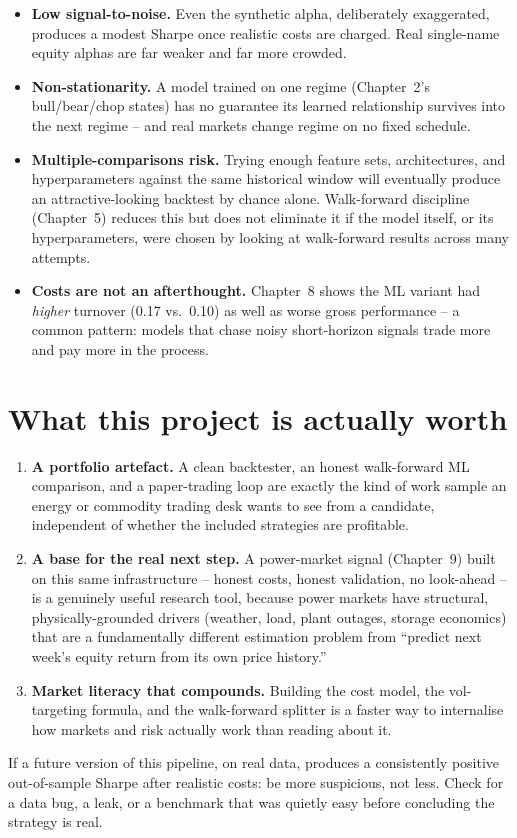 \begin{itemize}
  \item \textbf{Low signal-to-noise.} Even the synthetic alpha, deliberately
  exaggerated, produces a modest Sharpe once realistic costs are charged. Real
  single-name equity alphas are far weaker and far more crowded.
  \item \textbf{Non-stationarity.} A model trained on one regime (Chapter~2's
  bull/bear/chop states) has no guarantee its learned relationship survives
  into the next regime -- and real markets change regime on no fixed schedule.
  \item \textbf{Multiple-comparisons risk.} Trying enough feature sets,
  architectures, and hyperparameters against the same historical window will
  eventually produce an attractive-looking backtest by chance alone. Walk-forward
  discipline (Chapter~5) reduces this but does not eliminate it if the model
  itself, or its hyperparameters, were chosen by looking at walk-forward
  results across many attempts.
  \item \textbf{Costs are not an afterthought.} Chapter~8 shows the ML variant
  had \emph{higher} turnover (0.17 vs.\ 0.10) as well as worse gross performance
  -- a common pattern: models that chase noisy short-horizon signals trade more
  and pay more in the process.
\end{itemize}

\section{What this project is actually worth}

\begin{enumerate}
  \item \textbf{A portfolio artefact.} A clean backtester, an honest walk-forward
  ML comparison, and a paper-trading loop are exactly the kind of work sample an
  energy or commodity trading desk wants to see from a candidate, independent of
  whether the included strategies are profitable.
  \item \textbf{A base for the real next step.} A power-market signal (Chapter~9)
  built on this same infrastructure -- honest costs, honest validation, no
  look-ahead -- is a genuinely useful research tool, because power markets have
  structural, physically-grounded drivers (weather, load, plant outages, storage
  economics) that are a fundamentally different estimation problem from ``predict
  next week's equity return from its own price history.''
  \item \textbf{Market literacy that compounds.} Building the cost model, the
  vol-targeting formula, and the walk-forward splitter is a faster way to
  internalise how markets and risk actually work than reading about it.
\end{enumerate}

\begin{caveat}
If a future version of this pipeline, on real data, produces a consistently
positive out-of-sample Sharpe after realistic costs: be more suspicious, not
less. Check for a data bug, a leak, or a benchmark that was quietly easy before
concluding the strategy is real.
\end{caveat}
